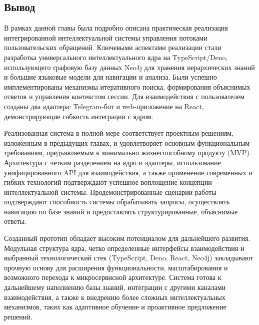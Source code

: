 \subsection{Вывод}

В рамках данной главы была подробно описана практическая реализация интегрированной интеллектуальной системы управления потоками пользовательских обращений. Ключевыми аспектами реализации стали разработка универсального интеллектуального ядра на TypeScript/Deno, использующего графовую базу данных Neo4j для хранения иерархических знаний и большие языковые модели для навигации и анализа. Были успешно имплементированы механизмы итеративного поиска, формирования объяснимых ответов и управления контекстом сессии. Для взаимодействия с пользователем созданы два адаптера: Telegram-бот и  web-приложение на React, демонстрирующие гибкость интеграции с ядром.

Реализованная система в полной мере соответствует проектным решениям, изложенным в предыдущих главах, и удовлетворяет основным функциональным требованиям, предъявляемым к минимально жизнеспособному продукту (MVP). Архитектура с четким разделением на ядро и адаптеры, использование унифицированного API для взаимодействия, а также применение современных и гибких технологий подтверждают успешное воплощение концепции интеллектуальной системы. Продемонстрированные сценарии работы подтверждают способность системы обрабатывать запросы, осуществлять навигацию по базе знаний и предоставлять структурированные, объяснимые ответы.

Созданный прототип обладает высоким потенциалом для дальнейшего развития. Модульная структура ядра, четко определенные интерфейсы взаимодействия и выбранный технологический стек (TypeScript, Deno, React, Neo4j) закладывают прочную основу для расширения функциональности, масштабирования и возможного перехода к микросервисной архитектуре. Система готова к дальнейшему наполнению базы знаний, интеграции с другими каналами взаимодействия, а также к внедрению более сложных интеллектуальных механизмов, таких как адаптивное обучение и проактивное предложение решений.